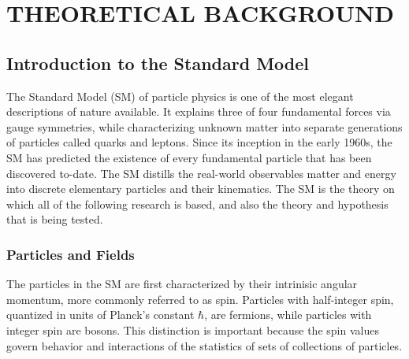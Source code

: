 %
%
%
%
%
%
%
%
%
%


%
%

\chapter{THEORETICAL BACKGROUND}
\section{Introduction to the Standard Model}
The Standard Model (SM) of particle physics is one of the most elegant descriptions of nature available. It explains three of four fundamental forces via gauge symmetries, while characterizing unknown matter into
separate generations of particles called quarks and leptons. Since its inception in the early 1960s, the SM has predicted the existence of every fundamental particle that has been discovered to-date.
The SM distills the real-world observables matter and energy into discrete elementary particles and their kinematics. The SM is the theory on which all of the following research is based, and also the theory and hypothesis that is being tested.

\subsection{Particles and Fields}
The particles in the SM are first characterized by their intrinisic angular momentum, more commonly referred to as spin. Particles with half-integer spin, quantized in units of Planck's constant $\hbar$, are fermions, while particles with integer spin are bosons.
This distinction is important because the spin values govern behavior and interactions of the statistics of sets of collections of particles. 

